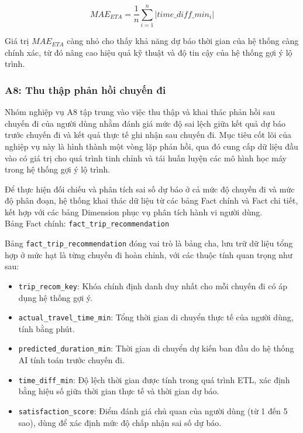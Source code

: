 \[
MAE_{ETA} = \frac{1}{n} \sum_{i=1}^{n} \left| time\_diff\_min_i \right|
\]

Giá trị $MAE_{ETA}$ càng nhỏ cho thấy khả năng dự báo thời gian của hệ thống càng chính xác, từ đó nâng cao hiệu quả kỹ thuật và độ tin cậy của hệ thống gợi ý lộ trình.

\subsubsection{A8: Thu thập phản hồi chuyến đi }

Nhóm nghiệp vụ A8 tập trung vào việc thu thập và khai thác phản hồi sau chuyến đi của người dùng nhằm đánh giá mức độ sai lệch giữa kết quả dự báo trước chuyến đi và kết quả thực tế ghi nhận sau chuyến đi. Mục tiêu cốt lõi của nghiệp vụ này là hình thành một vòng lặp phản hồi, qua đó cung cấp dữ liệu đầu vào có giá trị cho quá trình tinh chỉnh và tái huấn luyện các mô hình học máy trong hệ thống gợi ý lộ trình.


Để thực hiện đối chiếu và phân tích sai số dự báo ở cả mức độ chuyến đi và mức độ phân đoạn, hệ thống khai thác dữ liệu từ các bảng Fact chính và Fact chi tiết, kết hợp với các bảng Dimension phục vụ phân tích hành vi người dùng.\\

Bảng Fact chính: \texttt{fact\_trip\_recommendation}

Bảng \texttt{fact\_trip\_recommendation} đóng vai trò là bảng cha, lưu trữ dữ liệu tổng hợp ở mức hạt là từng chuyến đi hoàn chỉnh, với các thuộc tính quan trọng như sau:

\begin{itemize}
    \item \texttt{trip\_recom\_key}: Khóa chính định danh duy nhất cho mỗi chuyến đi có áp dụng hệ thống gợi ý.
    \item \texttt{actual\_travel\_time\_min}: Tổng thời gian di chuyển thực tế của người dùng, tính bằng phút.
    \item \texttt{predicted\_duration\_min}: Thời gian di chuyển dự kiến ban đầu do hệ thống AI tính toán trước chuyến đi.
    \item \texttt{time\_diff\_min}: Độ lệch thời gian được tính trong quá trình ETL, xác định bằng hiệu số giữa thời gian thực tế và thời gian dự báo.
    \item \texttt{satisfaction\_score}: Điểm đánh giá chủ quan của người dùng (từ 1 đến 5 sao), dùng để xác định mức độ chấp nhận sai số dự báo.
\end{itemize}

